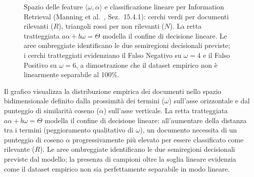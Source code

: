 \begin{figure}[H]
\caption{Spazio delle feature $\langle\omega, \alpha\rangle$ e classificazione lineare per Information Retrieval (Manning et al.~\cite{manning2008}, Sez.~15.4.1): cerchi verdi per documenti rilevanti ($R$), triangoli rossi per non rilevanti ($N$). La retta tratteggiata $a\alpha + b\omega = \Theta$ modella il confine di decisione lineare. Le aree ombreggiate identificano le due semiregioni decisionali previste; i cerchi tratteggiati evidenziano il Falso Negativo su $\omega=4$ e il Falso Positivo su $\omega=6$, a dimostrazione che il dataset empirico non \`e linearmente separabile al 100\%.}
\label{fig:ltr-linear-classification-space}
\end{figure}

Il grafico visualizza la distribuzione empirica dei documenti nello spazio bidimensionale definito dalla prossimit\`a dei termini ($\omega$) sull'asse orizzontale e dal punteggio di similarit\`a coseno ($\alpha$) sull'asse verticale. La retta tratteggiata $a\alpha + b\omega = \Theta$ modella il confine di decisione lineare: all'aumentare della distanza tra i termini (peggioramento qualitativo di $\omega$), un documento necessita di un punteggio di coseno $\alpha$ progressivamente pi\`u elevato per essere classificato come rilevante ($R$). Le aree ombreggiate identificano le due semiregioni decisionali previste dal modello; la presenza di campioni oltre la soglia lineare evidenzia come il dataset empirico non sia perfettamente separabile in modo lineare.

